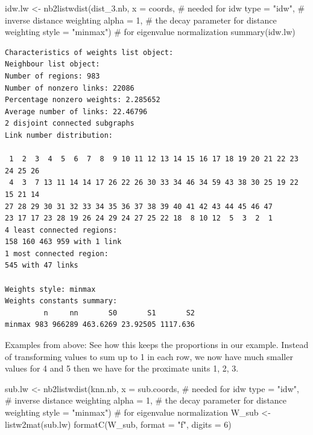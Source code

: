 \documentclass[
  letterpaper,
]{scrbook}
\newenvironment{Shaded}{\begin{snugshade}}{\end{snugshade}}
\newcommand{\AttributeTok}[1]{\textcolor[rgb]{0.40,0.45,0.13}{#1}}
\newcommand{\CommentTok}[1]{\textcolor[rgb]{0.37,0.37,0.37}{#1}}
\newcommand{\DecValTok}[1]{\textcolor[rgb]{0.68,0.00,0.00}{#1}}
\newcommand{\FunctionTok}[1]{\textcolor[rgb]{0.28,0.35,0.67}{#1}}
\newcommand{\NormalTok}[1]{\textcolor[rgb]{0.00,0.23,0.31}{#1}}
\newcommand{\OtherTok}[1]{\textcolor[rgb]{0.00,0.23,0.31}{#1}}
\newcommand{\StringTok}[1]{\textcolor[rgb]{0.13,0.47,0.30}{#1}}
\begin{document}
\begin{Shaded}
\begin{Highlighting}[]
\NormalTok{idw.lw }\OtherTok{\textless{}{-}} \FunctionTok{nb2listwdist}\NormalTok{(dist\_3.nb,}
                       \AttributeTok{x =}\NormalTok{ coords, }\CommentTok{\# needed for idw}
                       \AttributeTok{type =} \StringTok{"idw"}\NormalTok{, }\CommentTok{\# inverse distance weighting}
                       \AttributeTok{alpha =} \DecValTok{1}\NormalTok{, }\CommentTok{\# the decay parameter for distance weighting}
                       \AttributeTok{style =} \StringTok{"minmax"}\NormalTok{) }\CommentTok{\# for eigenvalue normalization}
\FunctionTok{summary}\NormalTok{(idw.lw)}
\end{Highlighting}
\end{Shaded}

\begin{verbatim}
Characteristics of weights list object:
Neighbour list object:
Number of regions: 983 
Number of nonzero links: 22086 
Percentage nonzero weights: 2.285652 
Average number of links: 22.46796 
2 disjoint connected subgraphs
Link number distribution:

 1  2  3  4  5  6  7  8  9 10 11 12 13 14 15 16 17 18 19 20 21 22 23 24 25 26 
 4  3  7 13 11 14 14 17 26 22 26 30 33 34 46 34 59 43 38 30 25 19 22 15 21 14 
27 28 29 30 31 32 33 34 35 36 37 38 39 40 41 42 43 44 45 46 47 
23 17 17 23 28 19 26 24 29 24 27 25 22 18  8 10 12  5  3  2  1 
4 least connected regions:
158 160 463 959 with 1 link
1 most connected region:
545 with 47 links

Weights style: minmax 
Weights constants summary:
         n     nn       S0       S1       S2
minmax 983 966289 463.6269 23.92505 1117.636
\end{verbatim}

Examples from above: See how this keeps the proportions in our example.
Instead of transforming values to sum up to 1 in each row, we now have
much smaller values for 4 and 5 then we have for the proximate units 1,
2, 3.

\begin{Shaded}
\begin{Highlighting}[]
\NormalTok{sub.lw }\OtherTok{\textless{}{-}} \FunctionTok{nb2listwdist}\NormalTok{(knn.nb,}
                       \AttributeTok{x =}\NormalTok{ sub.coords, }\CommentTok{\# needed for idw}
                       \AttributeTok{type =} \StringTok{"idw"}\NormalTok{, }\CommentTok{\# inverse distance weighting}
                       \AttributeTok{alpha =} \DecValTok{1}\NormalTok{, }\CommentTok{\# the decay parameter for distance weighting}
                       \AttributeTok{style =} \StringTok{"minmax"}\NormalTok{) }\CommentTok{\# for eigenvalue normalization}
\NormalTok{W\_sub }\OtherTok{\textless{}{-}} \FunctionTok{listw2mat}\NormalTok{(sub.lw)}
\FunctionTok{formatC}\NormalTok{(W\_sub, }\AttributeTok{format =} \StringTok{"f"}\NormalTok{, }\AttributeTok{digits =} \DecValTok{6}\NormalTok{)}
\end{Highlighting}
\end{Shaded}
\end{document}
